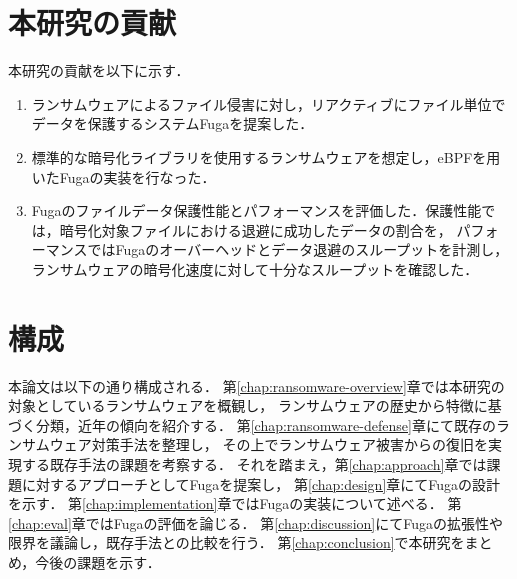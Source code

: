\section{本研究の貢献}
本研究の貢献を以下に示す．
\begin{enumerate}
  \item ランサムウェアによるファイル侵害に対し，リアクティブにファイル単位でデータを保護するシステムFugaを提案した．


  \item 標準的な暗号化ライブラリを使用するランサムウェアを想定し，eBPFを用いたFugaの実装を行なった．

  \item Fugaのファイルデータ保護性能とパフォーマンスを評価した．保護性能では，暗号化対象ファイルにおける退避に成功したデータの割合を，
        パフォーマンスではFugaのオーバーヘッドとデータ退避のスループットを計測し，ランサムウェアの暗号化速度に対して十分なスループットを確認した．
\end{enumerate}

\section{構成}
本論文は以下の通り構成される．
第\ref{chap:ransomware-overview}章では本研究の対象としているランサムウェアを概観し，
ランサムウェアの歴史から特徴に基づく分類，近年の傾向を紹介する．
第\ref{chap:ransomware-defense}章にて既存のランサムウェア対策手法を整理し，
その上でランサムウェア被害からの復旧を実現する既存手法の課題を考察する．
それを踏まえ，第\ref{chap:approach}章では課題に対するアプローチとしてFugaを提案し，
第\ref{chap:design}章にてFugaの設計を示す．
第\ref{chap:implementation}章ではFugaの実装について述べる．
第\ref{chap:eval}章ではFugaの評価を論じる．
第\ref{chap:discussion}にてFugaの拡張性や限界を議論し，既存手法との比較を行う．
第\ref{chap:conclusion}で本研究をまとめ，今後の課題を示す．
